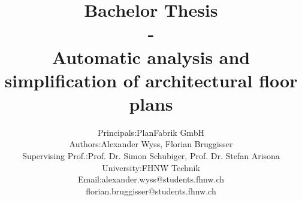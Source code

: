 \documentclass[11pt, a4paper]{report}
\begin{document}
	\title{\textbf{Bachelor Thesis \\ - \\Automatic analysis and simplification of architectural floor plans}}
	\author{
			\begin{tabular}{l  l}
				Principals: & PlanFabrik GmbH \\
				Authors: & Alexander Wyss, Florian Bruggisser \\
				Supervising Prof.: & Prof. Dr. Simon Schubiger, Prof. Dr. Stefan Arisona \\ University: & FHNW Technik \\
				Email: & alexander.wyss@students.fhnw.ch \\ & florian.bruggisser@students.fhnw.ch				
			\end{tabular}
	}
	
\maketitle



\tableofcontents
	










\clearpage
\printglossary

\clearpage
\listoffigures
\end{document}
